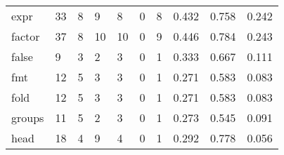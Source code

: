 \begin{longtable}{lp{2.0cm}p{2.0cm}p{2.0cm}p{2.0cm}p{2.0cm}p{2.0cm}p{2.0cm}p{2.0cm}p{2.0cm}}
expr      &                     33 &                                             8 &                                            9 &                                           8 &                                            0 &                                          8 &                                0.432 &                                  0.758 &                                0.242 \\
factor    &                     37 &                                             8 &                                           10 &                                          10 &                                            0 &                                          9 &                                0.446 &                                  0.784 &                                0.243 \\
false     &                      9 &                                             3 &                                            2 &                                           3 &                                            0 &                                          1 &                                0.333 &                                  0.667 &                                0.111 \\
fmt       &                     12 &                                             5 &                                            3 &                                           3 &                                            0 &                                          1 &                                0.271 &                                  0.583 &                                0.083 \\
fold      &                     12 &                                             5 &                                            3 &                                           3 &                                            0 &                                          1 &                                0.271 &                                  0.583 &                                0.083 \\
groups    &                     11 &                                             5 &                                            2 &                                           3 &                                            0 &                                          1 &                                0.273 &                                  0.545 &                                0.091 \\
head      &                     18 &                                             4 &                                            9 &                                           4 &                                            0 &                                          1 &                                0.292 &                                  0.778 &                                0.056 \\

\end{longtable}
